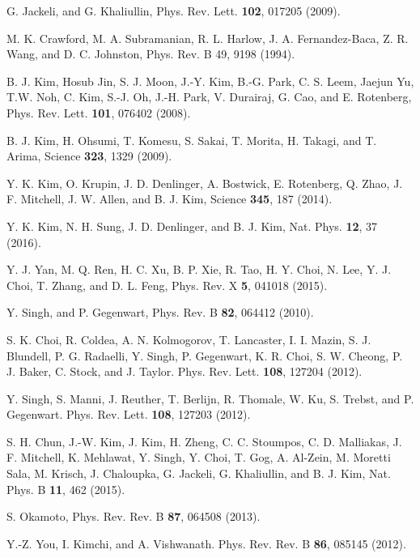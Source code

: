 \documentclass[aps,prb,twocolumn]{revtex4-1}
\begin{document}
\begin{references}

 G. Jackeli, and G. Khaliullin, Phys. Rev. Lett. {\bf 102}, 017205 (2009).

M. K. Crawford, M. A. Subramanian, R. L. Harlow, J. A. Fernandez-Baca, Z. R. Wang, and D. C. Johnston, Phys. Rev. B 49, 9198 (1994).

 B. J. Kim, Hosub Jin, S. J. Moon, J.-Y. Kim, B.-G. Park, C. S. Leem, Jaejun Yu, T.W. Noh, C. Kim, S.-J. Oh, J.-H. Park, V. Durairaj, G. Cao, and E. Rotenberg, Phys. Rev. Lett. {\bf 101}, 076402 (2008).

 B. J. Kim, H. Ohsumi, T. Komesu, S. Sakai, T. Morita, H. Takagi, and T. Arima, Science {\bf 323}, 1329 (2009).

 Y. K. Kim, O. Krupin, J. D. Denlinger, A. Bostwick, E. Rotenberg, Q. Zhao, J. F. Mitchell, J. W. Allen, and B. J. Kim, Science {\bf 345}, 187 (2014).

 Y. K. Kim, N. H. Sung, J. D. Denlinger, and B. J. Kim, Nat. Phys. {\bf 12}, 37 (2016).

 Y. J. Yan, M. Q. Ren, H. C. Xu, B. P. Xie, R. Tao, H. Y. Choi, N. Lee, Y. J. Choi, T. Zhang, and D. L. Feng, Phys. Rev. X {\bf 5}, 041018 (2015).

 Y. Singh, and P. Gegenwart, Phys. Rev. B { \bf 82}, 064412 (2010).

 S. K. Choi, R. Coldea, A. N. Kolmogorov, T. Lancaster, I. I. Mazin, S. J. Blundell, P. G. Radaelli, Y. Singh, P. Gegenwart, K. R. Choi, S. W. Cheong, P. J. Baker, C. Stock, and J. Taylor. Phys. Rev. Lett.  {\bf 108}, 127204 (2012).

 Y. Singh, S. Manni, J. Reuther, T. Berlijn, R. Thomale, W. Ku, S. Trebst, and P. Gegenwart. Phys. Rev. Lett. {\bf 108}, 127203 (2012).

 S. H. Chun, J.-W. Kim, J. Kim, H. Zheng, C. C. Stoumpos, C. D. Malliakas, J. F. Mitchell, K. Mehlawat, Y. Singh, Y. Choi, T. Gog, A. Al-Zein, M. Moretti Sala, M. Krisch, J. Chaloupka, G. Jackeli, G. Khaliullin, and B. J. Kim, Nat. Phys. B {\bf 11}, 462 (2015). 

 S. Okamoto, Phys. Rev. Rev. B {\bf 87}, 064508 (2013).

 Y.-Z. You, I. Kimchi, and A. Vishwanath. Phys. Rev. Rev. B {\bf 86}, 085145 (2012).


\end{references}
\end{document}
